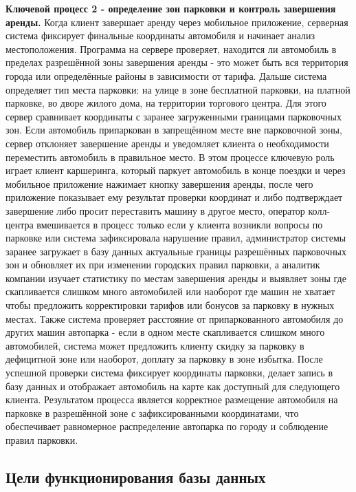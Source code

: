 \textbf{Ключевой процесс 2 - определение зон парковки и контроль завершения аренды.} Когда клиент завершает аренду через мобильное приложение, серверная система фиксирует финальные координаты автомобиля и начинает анализ местоположения. Программа на сервере проверяет, находится ли автомобиль в пределах разрешённой зоны завершения аренды - это может быть вся территория города или определённые районы в зависимости от тарифа. Дальше система определяет тип места парковки: на улице в зоне бесплатной парковки, на платной парковке, во дворе жилого дома, на территории торгового центра. Для этого сервер сравнивает координаты с заранее загруженными границами парковочных зон. Если автомобиль припаркован в запрещённом месте вне парковочной зоны, сервер отклоняет завершение аренды и уведомляет клиента о необходимости переместить автомобиль в правильное место. В этом процессе ключевую роль играет клиент каршеринга, который паркует автомобиль в конце поездки и через мобильное приложение нажимает кнопку завершения аренды, после чего приложение показывает ему результат проверки координат и либо подтверждает завершение либо просит переставить машину в другое место, оператор колл-центра вмешивается в процесс только если у клиента возникли вопросы по парковке или система зафиксировала нарушение правил, администратор системы заранее загружает в базу данных актуальные границы разрешённых парковочных зон и обновляет их при изменении городских правил парковки, а аналитик компании изучает статистику по местам завершения аренды и выявляет зоны где скапливается слишком много автомобилей или наоборот где машин не хватает чтобы предложить корректировки тарифов или бонусов за парковку в нужных местах. Также система проверяет расстояние от припаркованного автомобиля до других машин автопарка - если в одном месте скапливается слишком много автомобилей, система может предложить клиенту скидку за парковку в дефицитной зоне или наоборот, доплату за парковку в зоне избытка. После успешной проверки система фиксирует координаты парковки, делает запись в базу данных и отображает автомобиль на карте как доступный для следующего клиента. Результатом процесса является корректное размещение автомобиля на парковке в разрешённой зоне с зафиксированными координатами, что обеспечивает равномерное распределение автопарка по городу и соблюдение правил парковки.

\subsection{Цели функционирования базы данных}

